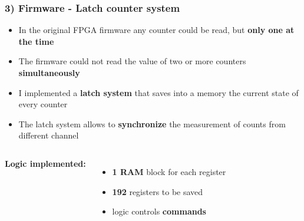 \documentclass[aspectratio=169]{beamer}
\begin{document}
	\begin{frame}
		\frametitle{3) Firmware - Latch counter system}
		\begin{itemize}
			\item In the original FPGA firmware any counter could be read, but \textbf{only one at the time}
			\item The firmware could not read the value of two or more counters \textbf{simultaneously}
			\item I implemented a \textbf{latch system} that saves into a memory the current state of every counter
			\item The latch system allows to \textbf{synchronize} the measurement of counts from different channel
		\end{itemize}
		\begin{columns}
			{\color{blue} \textbf{Logic implemented:}}
			\begin{itemize}
				\item \textbf{1 RAM} block for each register
				\item \textbf{192} registers to be saved
				\item logic controls \textbf{commands}
			\end{itemize}
			\begin{center}

\end{center}
\end{columns}
\end{frame}
\end{document}
